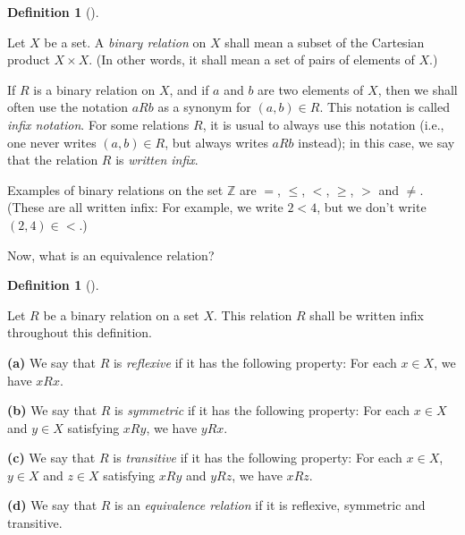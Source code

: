 \documentclass[numbers=enddot,12pt,final,onecolumn,notitlepage]{scrartcl}%
\theoremstyle{definition}
\newtheorem{defi}[theo]{Definition}
\newenvironment{definition}[1][]
{\begin{defi}[#1]\begin{leftbar}}
{\end{leftbar}\end{defi}}
\newcommand{\ZZ}{\mathbb{Z}}
\newcommand{\tup}[1]{\left( #1 \right)}
\begin{document}
\begin{definition} \label{def.intro.relation}
Let $X$ be a set. A \textit{binary relation} on $X$ shall mean a
subset of the Cartesian product $X \times X$. (In other words, it
shall mean a set of pairs of elements of $X$.)

If $R$ is a binary relation on $X$, and if $a$ and $b$ are two
elements of $X$, then we shall often use the notation $a R b$ as a
synonym for $\tup{a, b} \in R$. This notation is called
\textit{infix notation}. For some relations $R$, it is usual to always
use this notation (i.e., one never writes $\tup{a, b} \in R$, but
always writes $a R b$ instead); in this case, we say that the relation
$R$ is \textit{written infix}.
\end{definition}

Examples of binary relations on the set $\ZZ$ are $=$, $\leq$, $<$,
$\geq$, $>$ and $\neq$. (These are all written infix: For example, we
write $2 < 4$, but we don't write $\tup{2, 4} \in <$.)

Now, what is an equivalence relation?

\begin{definition} \label{def.intro.equiv-rel}
Let $R$ be a binary relation on a set $X$. This relation $R$ shall be
written infix throughout this definition.

\textbf{(a)} We say that $R$ is \textit{reflexive} if it has the
following property: For each $x \in X$, we have $x R x$.

\textbf{(b)} We say that $R$ is \textit{symmetric} if it has the
following property: For each $x \in X$ and $y \in X$ satisfying
$x R y$, we have $y R x$.

\textbf{(c)} We say that $R$ is \textit{transitive} if it has the
following property: For each $x \in X$, $y \in X$ and $z \in X$
satisfying $x R y$ and $y R z$, we have $x R z$.

\textbf{(d)} We say that $R$ is an \textit{equivalence relation} if it
is reflexive, symmetric and transitive.
\end{definition}
\end{document}
